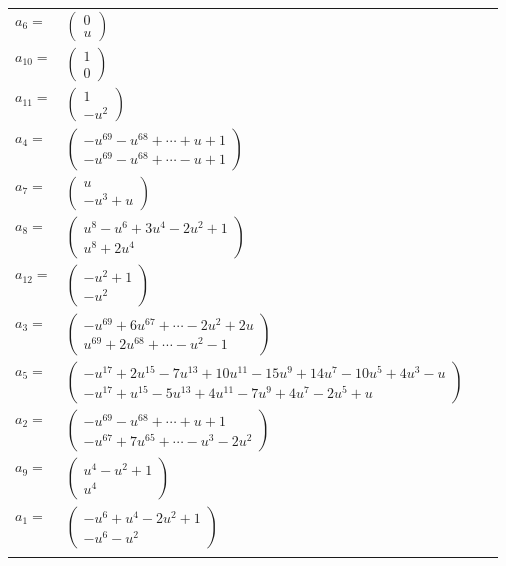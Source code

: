 \documentclass[1p]{elsarticle_modified}
\theoremstyle{definition}
\begin{document}
\begin{tabular}{m{7pt} m{180pt} m{7pt} m{180pt} }
\flushright $a_{6}=$&$\begin{pmatrix}0\\u\end{pmatrix}$ \\
\flushright $a_{10}=$&$\begin{pmatrix}1\\0\end{pmatrix}$ \\
\flushright $a_{11}=$&$\begin{pmatrix}1\\- u^2\end{pmatrix}$ \\
\flushright $a_{4}=$&$\begin{pmatrix}- u^{69}- u^{68}+\cdots+u+1\\- u^{69}- u^{68}+\cdots- u+1\end{pmatrix}$ \\
\flushright $a_{7}=$&$\begin{pmatrix}u\\- u^3+u\end{pmatrix}$ \\
\flushright $a_{8}=$&$\begin{pmatrix}u^8- u^6+3 u^4-2 u^2+1\\u^8+2 u^4\end{pmatrix}$ \\
\flushright $a_{12}=$&$\begin{pmatrix}- u^2+1\\- u^2\end{pmatrix}$ \\
\flushright $a_{3}=$&$\begin{pmatrix}- u^{69}+6 u^{67}+\cdots-2 u^2+2 u\\u^{69}+2 u^{68}+\cdots- u^2-1\end{pmatrix}$ \\
\flushright $a_{5}=$&$\begin{pmatrix}- u^{17}+2 u^{15}-7 u^{13}+10 u^{11}-15 u^9+14 u^7-10 u^5+4 u^3- u\\- u^{17}+u^{15}-5 u^{13}+4 u^{11}-7 u^9+4 u^7-2 u^5+u\end{pmatrix}$ \\
\flushright $a_{2}=$&$\begin{pmatrix}- u^{69}- u^{68}+\cdots+u+1\\- u^{67}+7 u^{65}+\cdots- u^3-2 u^2\end{pmatrix}$ \\
\flushright $a_{9}=$&$\begin{pmatrix}u^4- u^2+1\\u^4\end{pmatrix}$ \\
\flushright $a_{1}=$&$\begin{pmatrix}- u^6+u^4-2 u^2+1\\- u^6- u^2\end{pmatrix}$\\&\end{tabular}
\end{document}
